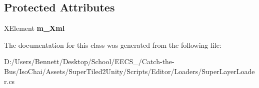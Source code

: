 \subsection*{Protected Attributes}
\begin{DoxyCompactItemize}
\item 
\mbox{\label{class_super_tiled2_unity_1_1_editor_1_1_super_layer_loader_ab14827e4d011dcd5ce0409e730ebc5fd}} 
X\+Element {\bfseries m\+\_\+\+Xml}
\end{DoxyCompactItemize}


The documentation for this class was generated from the following file\+:\begin{DoxyCompactItemize}
\item 
D\+:/\+Users/\+Bennett/\+Desktop/\+School/\+E\+E\+C\+S\+\_/\+Catch-\/the-\/\+Bus/\+Iso\+Chai/\+Assets/\+Super\+Tiled2\+Unity/\+Scripts/\+Editor/\+Loaders/Super\+Layer\+Loader.\+cs\end{DoxyCompactItemize}

